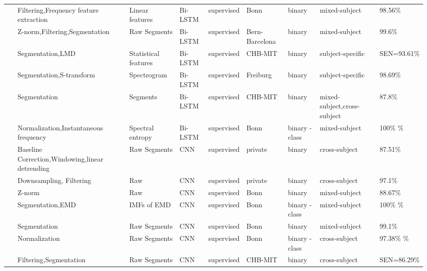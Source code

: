 \begin{table*}[ht]
\begin{tabular}{p{0.4cm}p{2.8cm}p{2cm}p{1.5cm}p{1.9cm}p{1.9cm}p{0.8cm}p{1.8cm}p{1.5cm}}
~\cite{Seizure43} & Filtering,Frequency feature extraction & Linear features & Bi-LSTM & supervised & Bonn & binary & mixed-subject & 98.56\% \\
~\cite{Seizure44} & Z-norm,Filtering,\newline Segmentation & Raw Segments & Bi-LSTM & supervised & Bern-Barcelona & binary & mixed-subject & 99.6\% \\
~\cite{Seizure45} & Segmentation,LMD & Statistical features & Bi-LSTM & supervised & CHB-MIT & binary & subject-specific & SEN=93.61\% \\
~\cite{Seizure46} & Segmentation,\newline S-transform & Spectrogram & Bi-LSTM & supervised & Freiburg & binary & subject-specific & 98.69\% \\
~\cite{Seizure47} & Segmentation & Segments & Bi-LSTM & supervised & CHB-MIT & binary & mixed-subject,\newline cross-subject & 87.8\% \\
~\cite{Seizure48} & Normalization,\newline Instantaneous frequency & Spectral entropy & Bi-LSTM & supervised & Bonn & binary \newline
5-class & mixed-subject & 100\% \newline
96\% \\
~\cite{Seizure49} & Baseline Correction,\newline Windowing,linear detrending & Raw Segments & CNN & supervised & private & binary & cross-subject & 87.51\% \\
~\cite{Seizure50} & Downsampling,
Filtering & Raw & CNN & supervised & private & binary & cross-subject & 97.1\% \\
~\cite{ACHARYA2018270} & Z-norm & Raw & CNN & supervised & Bonn & binary & mixed-subject & 88.67\% \\
~\cite{Seizure52} & Segmentation,EMD & IMFs of EMD & CNN & supervised & Bonn & binary \newline
3-class & mixed-subject & 100\% \newline
98.6\% \\
~\cite{Seizure53} & Segmentation & Raw Segments & CNN & supervised & Bonn & binary & mixed-subject & 99.1\% \\
~\cite{Seizure54} & Normalization & Raw Segments & CNN & supervised & Bonn & binary \newline
5-class & cross-subject & 97.38\% \newline
93.67\% \\
~\cite{Seizure55} & Filtering,Segmentation & Raw Segments & CNN & supervised & CHB-MIT & binary & cross-subject & SEN=86.29\% \\

\end{tabular}
\end{table*}
